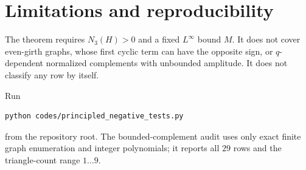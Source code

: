 \documentclass[11pt]{article}
\begin{document}
\section{Limitations and reproducibility}

The theorem requires $N_3(H)>0$ and a fixed $L^\infty$ bound $M$.  It does
not cover even-girth graphs, whose first cyclic term can have the opposite
sign, or $q$-dependent normalized complements with unbounded amplitude.  It
does not classify any row by itself.

Run
\begin{verbatim}
python codes/principled_negative_tests.py
\end{verbatim}
from the repository root.  The bounded-complement audit uses only exact
finite graph enumeration and integer polynomials; it reports all $29$ rows
and the triangle-count range $1\ldots9$.
\end{document}
